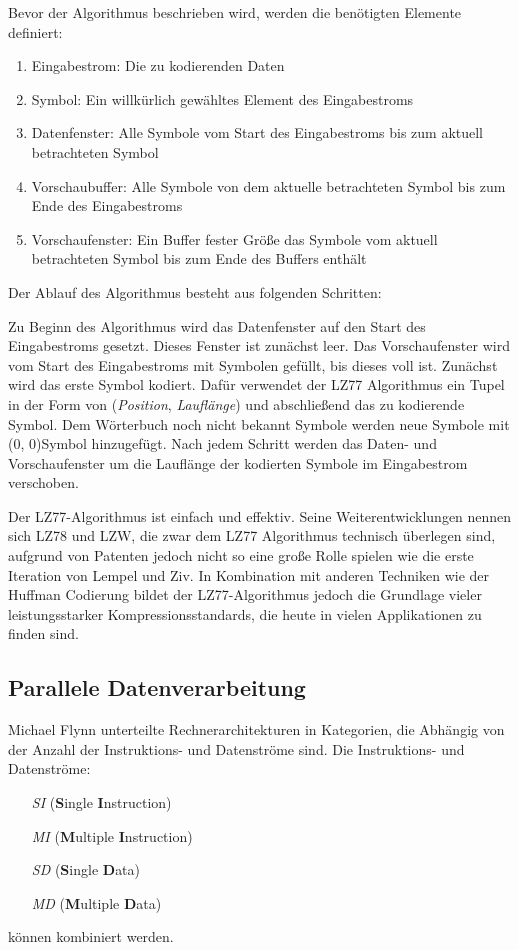 Bevor der Algorithmus beschrieben wird, werden die benötigten Elemente definiert:

\begin{enumerate}
\item{Eingabestrom:} Die zu kodierenden Daten
\item{Symbol:} Ein willkürlich gewähltes Element des Eingabestroms
\item{Datenfenster:} Alle Symbole vom Start des Eingabestroms bis zum aktuell betrachteten Symbol
\item{Vorschaubuffer:} Alle Symbole von dem aktuelle betrachteten Symbol bis zum Ende des Eingabestroms
\item{Vorschaufenster:} Ein Buffer fester Größe das Symbole vom aktuell betrachteten Symbol bis zum Ende des Buffers enthält
\end{enumerate}

Der Ablauf des Algorithmus besteht aus folgenden Schritten:

Zu Beginn des Algorithmus wird das Datenfenster auf den Start des Eingabestroms gesetzt.
Dieses Fenster ist zunächst leer.
Das Vorschaufenster wird vom Start des Eingabestroms mit Symbolen gefüllt, bis dieses voll ist.
Zunächst wird das erste Symbol kodiert.
Dafür verwendet der LZ77 Algorithmus ein Tupel in der Form von (\textit{Position}, \textit{Lauflänge}) und abschließend das zu kodierende Symbol.
Dem Wörterbuch noch nicht bekannt Symbole werden neue Symbole mit (0, 0)Symbol hinzugefügt.
Nach jedem Schritt werden das Daten- und Vorschaufenster um die Lauflänge der kodierten Symbole im Eingabestrom verschoben.
\cite{Microsoft2023}

Der LZ77-Algorithmus ist einfach und effektiv.
Seine Weiterentwicklungen nennen sich LZ78 und LZW, die zwar dem LZ77 Algorithmus technisch überlegen sind, aufgrund von Patenten jedoch nicht so eine große Rolle spielen wie die erste Iteration von Lempel und Ziv.
In Kombination mit anderen Techniken wie der Huffman Codierung bildet der LZ77-Algorithmus jedoch die Grundlage vieler leistungsstarker Kompressionsstandards, die heute in vielen Applikationen zu finden sind.

\subsection{Parallele Datenverarbeitung}
\label{subsec:flynn}
Michael Flynn unterteilte Rechnerarchitekturen in Kategorien, die Abhängig von der Anzahl der Instruktions- und Datenströme sind. \newline
Die Instruktions- und Datenströme:
\begin{enumerate}
\item[\textit{SI}] (\textbf{S}ingle \textbf{I}nstruction)
\item[\textit{MI}] (\textbf{M}ultiple \textbf{I}nstruction) 
\item[\textit{SD}] (\textbf{S}ingle \textbf{D}ata) 
\item[\textit{MD}] (\textbf{M}ultiple \textbf{D}ata) 
\end{enumerate}
können kombiniert werden. \newline

